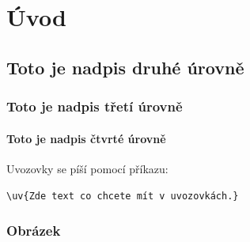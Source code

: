 









\newpage
\setcounter{page}{9} %
\pagestyle{plain}
\parindent=0.6cm





\section{Úvod}

\subsection{Toto je nadpis druhé úrovně}

\subsubsection{Toto je nadpis třetí úrovně}

\paragraph{Toto je nadpis čtvrté úrovně}

Uvozovky se píší pomocí příkazu:

\verb|\uv{Zde text co chcete mít v uvozovkách.}|





\subsubsection{Obrázek}
 
